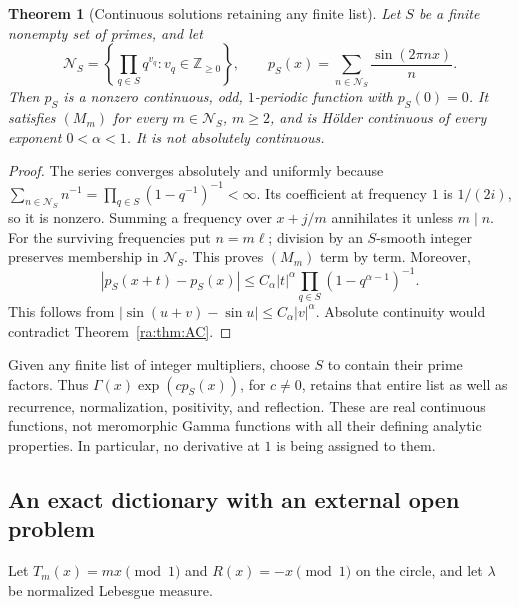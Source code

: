 \documentclass[11pt,a4paper]{article}
\newcommand{\Z}{\mathbb Z}
\newtheorem{theorem}{Theorem}[section]
\theoremstyle{definition}
\theoremstyle{remark}
\theoremstyle{plain}
\numberwithin{equation}{section}
\begin{document}
\begin{theorem}[Continuous solutions retaining any finite list]
\label{ra:thm:smoothseries}
Let $S$ be a finite nonempty set of primes, and let
\[
 \mathcal N_S=\left\{\prod_{q\in S}q^{v_q}:v_q\in\Z_{\ge0}\right\},
 \qquad
 p_S(x)=\sum_{n\in\mathcal N_S}\frac{\sin(2\pi nx)}n.
\]
Then $p_S$ is a nonzero continuous, odd, $1$-periodic function with
$p_S(0)=0$. It satisfies $(M_m)$ for every $m\in\mathcal N_S$, $m\ge2$,
and is H\"older continuous of every exponent $0<\alpha<1$.
It is not absolutely continuous.
\end{theorem}
\begin{proof}
The series converges absolutely and uniformly because
$\sum_{n\in\mathcal N_S}n^{-1}=\prod_{q\in S}(1-q^{-1})^{-1}<\infty$.
Its coefficient at frequency $1$ is $1/(2i)$, so it is nonzero.
Summing a frequency over $x+j/m$ annihilates it unless $m\mid n$.
For the surviving frequencies put $n=m\ell$; division by an
$S$-smooth integer preserves membership in $\mathcal N_S$. This proves
$(M_m)$ term by term. Moreover,
\[
 |p_S(x+t)-p_S(x)|\le
 C_\alpha |t|^\alpha
 \prod_{q\in S}(1-q^{\alpha-1})^{-1}.
\]
This follows from $|\sin(u+v)-\sin u|\le C_\alpha |v|^\alpha$.
Absolute continuity would contradict Theorem~\ref{ra:thm:AC}.
\end{proof}

Given any finite list of integer multipliers, choose $S$ to contain their
prime factors. Thus $\Gamma(x)\exp(c p_S(x))$, for $c\ne0$, retains that
entire list as well as recurrence, normalization, positivity, and
reflection. These are real continuous functions, not meromorphic Gamma
functions with all their defining analytic properties. In particular,
no derivative at $1$ is being assigned to them.

\subsection{An exact dictionary with an external open problem}

Let $T_m(x)=mx\pmod1$ and $R(x)=-x\pmod1$ on the circle, and let
$\lambda$ be normalized Lebesgue measure.
\end{document}
